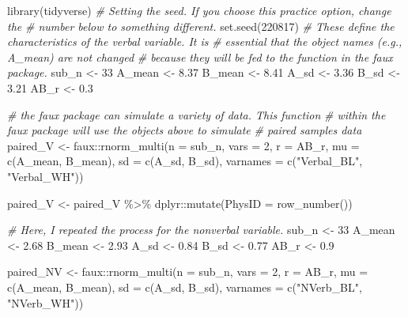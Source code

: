 \documentclass[
  11pt,
]{book}
\newenvironment{Shaded}{\begin{snugshade}}{\end{snugshade}}
\newcommand{\AttributeTok}[1]{\textcolor[rgb]{0.77,0.63,0.00}{#1}}
\newcommand{\CommentTok}[1]{\textcolor[rgb]{0.56,0.35,0.01}{\textit{#1}}}
\newcommand{\DecValTok}[1]{\textcolor[rgb]{0.00,0.00,0.81}{#1}}
\newcommand{\FloatTok}[1]{\textcolor[rgb]{0.00,0.00,0.81}{#1}}
\newcommand{\FunctionTok}[1]{\textcolor[rgb]{0.00,0.00,0.00}{#1}}
\newcommand{\NormalTok}[1]{#1}
\newcommand{\OtherTok}[1]{\textcolor[rgb]{0.56,0.35,0.01}{#1}}
\newcommand{\SpecialCharTok}[1]{\textcolor[rgb]{0.00,0.00,0.00}{#1}}
\newcommand{\StringTok}[1]{\textcolor[rgb]{0.31,0.60,0.02}{#1}}
\begin{document}
\begin{Shaded}
\begin{Highlighting}[]
\FunctionTok{library}\NormalTok{(tidyverse)}
\CommentTok{\# Setting the seed. If you choose this practice option, change the}
\CommentTok{\# number below to something different.}
\FunctionTok{set.seed}\NormalTok{(}\DecValTok{220817}\NormalTok{)}
\CommentTok{\# These define the characteristics of the verbal variable. It is}
\CommentTok{\# essential that the object names (e.g., A\_mean) are not changed}
\CommentTok{\# because they will be fed to the function in the faux package.}
\NormalTok{sub\_n }\OtherTok{\textless{}{-}} \DecValTok{33}
\NormalTok{A\_mean }\OtherTok{\textless{}{-}} \FloatTok{8.37}
\NormalTok{B\_mean }\OtherTok{\textless{}{-}} \FloatTok{8.41}
\NormalTok{A\_sd }\OtherTok{\textless{}{-}} \FloatTok{3.36}
\NormalTok{B\_sd }\OtherTok{\textless{}{-}} \FloatTok{3.21}
\NormalTok{AB\_r }\OtherTok{\textless{}{-}} \FloatTok{0.3}

\CommentTok{\# the faux package can simulate a variety of data. This function}
\CommentTok{\# within the faux package will use the objects above to simulate}
\CommentTok{\# paired samples data}
\NormalTok{paired\_V }\OtherTok{\textless{}{-}}\NormalTok{ faux}\SpecialCharTok{::}\FunctionTok{rnorm\_multi}\NormalTok{(}\AttributeTok{n =}\NormalTok{ sub\_n, }\AttributeTok{vars =} \DecValTok{2}\NormalTok{, }\AttributeTok{r =}\NormalTok{ AB\_r, }\AttributeTok{mu =} \FunctionTok{c}\NormalTok{(A\_mean,}
\NormalTok{    B\_mean), }\AttributeTok{sd =} \FunctionTok{c}\NormalTok{(A\_sd, B\_sd), }\AttributeTok{varnames =} \FunctionTok{c}\NormalTok{(}\StringTok{"Verbal\_BL"}\NormalTok{, }\StringTok{"Verbal\_WH"}\NormalTok{))}

\NormalTok{paired\_V }\OtherTok{\textless{}{-}}\NormalTok{ paired\_V }\SpecialCharTok{\%\textgreater{}\%}
\NormalTok{    dplyr}\SpecialCharTok{::}\FunctionTok{mutate}\NormalTok{(}\AttributeTok{PhysID =} \FunctionTok{row\_number}\NormalTok{())}

\CommentTok{\# Here, I repeated the process for the nonverbal variable.}
\NormalTok{sub\_n }\OtherTok{\textless{}{-}} \DecValTok{33}
\NormalTok{A\_mean }\OtherTok{\textless{}{-}} \FloatTok{2.68}
\NormalTok{B\_mean }\OtherTok{\textless{}{-}} \FloatTok{2.93}
\NormalTok{A\_sd }\OtherTok{\textless{}{-}} \FloatTok{0.84}
\NormalTok{B\_sd }\OtherTok{\textless{}{-}} \FloatTok{0.77}
\NormalTok{AB\_r }\OtherTok{\textless{}{-}} \FloatTok{0.9}

\NormalTok{paired\_NV }\OtherTok{\textless{}{-}}\NormalTok{ faux}\SpecialCharTok{::}\FunctionTok{rnorm\_multi}\NormalTok{(}\AttributeTok{n =}\NormalTok{ sub\_n, }\AttributeTok{vars =} \DecValTok{2}\NormalTok{, }\AttributeTok{r =}\NormalTok{ AB\_r, }\AttributeTok{mu =} \FunctionTok{c}\NormalTok{(A\_mean,}
\NormalTok{    B\_mean), }\AttributeTok{sd =} \FunctionTok{c}\NormalTok{(A\_sd, B\_sd), }\AttributeTok{varnames =} \FunctionTok{c}\NormalTok{(}\StringTok{"NVerb\_BL"}\NormalTok{, }\StringTok{"NVerb\_WH"}\NormalTok{))}


\end{Highlighting}
\end{Shaded}
\end{document}

